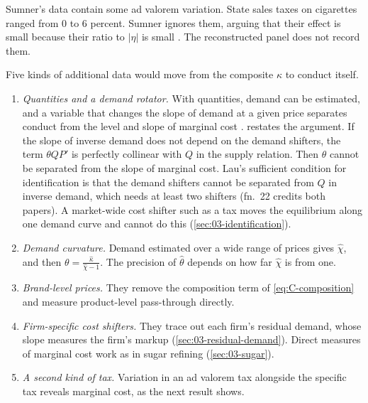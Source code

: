Sumner's data contain some ad valorem variation. State sales taxes on cigarettes ranged from 0 to 6 percent. Sumner
ignores them, arguing that their effect is small because their ratio to $\lvert\eta\rvert$ is small
\citep[n.~4]{Sumner1981}. The reconstructed panel does not record them.

Five kinds of additional data would move from the composite $\kappa$ to conduct itself.
\begin{enumerate}[label=\arabic*.]
\item \emph{Quantities and a demand rotator.} With quantities, demand can be estimated, and a variable that changes
  the slope of demand at a given price separates conduct from the level and slope of marginal cost
  \citep{Bresnahan1982,Lau1982}. \citet[Section~3.1, pp.~1032--1034]{Bresnahan1989} restates the argument. If the slope
  of inverse demand does not depend on the demand shifters, the term $\theta QP'$ is perfectly collinear with $Q$ in the
  supply relation. Then $\theta$ cannot be separated from the slope of marginal cost. Lau's sufficient condition for
  identification is that the demand shifters cannot be separated from $Q$ in inverse demand, which needs at least two
  shifters (fn.~22 credits both papers). A market-wide cost shifter such as a tax moves the equilibrium along one demand curve and cannot do this
  (\cref{sec:03-identification}).
\item \emph{Demand curvature.} Demand estimated over a wide range of prices gives $\hat\chi$, and then
  $\theta = \frac{\hat\kappa}{\hat\chi - 1}$. The precision of $\hat\theta$ depends on how far $\hat\chi$ is from one.
\item \emph{Brand-level prices.} They remove the composition term of \eqref{eq:C-composition} and measure
  product-level pass-through directly.
\item \emph{Firm-specific cost shifters.} They trace out each firm's residual demand, whose slope measures the firm's
  markup (\cref{sec:03-residual-demand}). Direct measures of marginal cost work as in sugar refining
  (\cref{sec:03-sugar}).
\item \emph{A second kind of tax.} Variation in an ad valorem tax alongside the specific tax reveals marginal cost,
  as the next result shows.
\end{enumerate}

